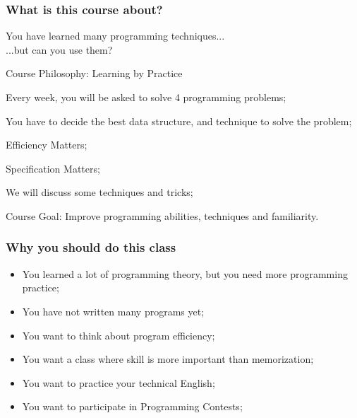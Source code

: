 \documentclass{beamer}
\begin{document}
\begin{frame}
  \frametitle{What is this course about?}
  
  You have learned many programming techniques...\\\hfill ...but can you use them?

  \begin{block}{Course Philosophy: Learning by Practice}
    \begin{itemize}
      {\small
    \item Every week, you will be asked to solve 4 programming
      problems;
    \item You have to decide the best data structure, and technique to
      solve the problem;
    \item Efficiency Matters;
    \item Specification Matters;
    \item We will discuss some techniques and tricks;
      }
    \end{itemize}
  \end{block}

  \begin{exampleblock}{Course Goal:}
    Improve programming abilities, techniques and familiarity.
  \end{exampleblock}
\end{frame}

\begin{frame}
  \frametitle{Why you should do this class}
  \begin{itemize}
  \item You learned a lot of programming theory, but you need more
    programming practice;
    
    \smallskip

  \item You have not written many programs yet;

    \smallskip

  \item You want to think about program efficiency;

    \smallskip

  \item You want a class where skill is more important than memorization;

    \smallskip

  \item You want to practice your technical English;

    \smallskip

  \item You want to participate in Programming Contests;
  \end{itemize}
\end{frame}
\end{document}
